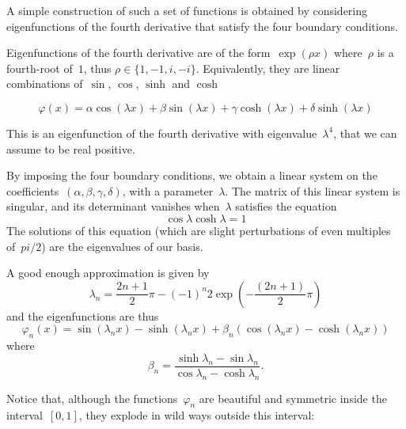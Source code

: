A simple construction of such a set of functions is obtained by considering
eigenfunctions of the fourth derivative that satisfy the four boundary
conditions.

Eigenfunctions of the fourth derivative are of the form~$\exp(\rho x)$
where~$\rho$ is a fourth-root of~$1$, thus $\rho\in\{1,-1,i,-i\}$.
Equivalently, they are linear combinations of~$\sin$, $\cos$, $\sinh$ and
$\cosh$

$$
\varphi(x)=\alpha\cos(\lambda x)+\beta\sin(\lambda x)+\gamma\cosh(\lambda
x)+\delta\sinh(\lambda x)
$$

This is an eigenfunction of the fourth derivative with
eigenvalue~$\lambda^4$, that we can assume to be real positive.

By imposing the four boundary conditions, we obtain a linear system on the
coefficients~$(\alpha,\beta,\gamma,\delta)$, with a parameter~$\lambda$.  The
matrix of this linear system is singular, and its determinant vanishes
when~$\lambda$ satisfies the equation
$$
\cos\lambda\cosh\lambda=1
$$
The solutions of this equation (which are slight perturbations of even
multiples of~$pi/2$)
are the eigenvalues of our basis.

A good enough approximation is given by
$$
\lambda_n = \frac{2n+1}{2}\pi - (-1)^n2\exp\left(-\frac{(2n+1)}{2}\pi\right)
$$
and the eigenfunctions are thus
$$
\varphi_n(x)=\sin(\lambda_nx)-\sinh(\lambda_nx)+\beta_n(\cos(\lambda_nx)-\cosh(\lambda_nx))
$$
where
$$
\beta_n=\frac{\sinh\lambda_n-\sin\lambda_n}{\cos\lambda_n-\cosh\lambda_n}.
$$

Notice that, although the functions~$\varphi_n$ are beautiful and symmetric
inside the interval~$[0,1]$, they explode in wild ways outside this interval:

